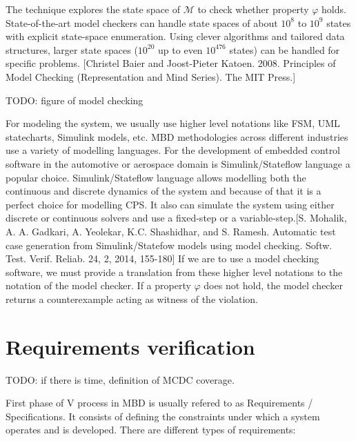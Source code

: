 The technique explores the state space of $\mathcal{M}$ to check whether property $\varphi$ holds. State-of-the-art model checkers can handle state spaces of about $10^8$ to $10^9$ states with explicit state-space enumeration. Using clever algorithms and tailored data structures, larger state spaces ($10^20$ up to even $10^476$ states) can be handled for specific problems. [Christel Baier and Joost-Pieter Katoen. 2008. Principles of Model Checking (Representation and Mind Series). The MIT Press.]

TODO: figure of model checking

For modeling the system, we usually use higher level notations like FSM, UML statecharts, Simulink models, etc. MBD methodologies across different industries use a variety of modelling languages. For the development of embedded control software in the automotive or aerospace domain is Simulink/Stateflow language a popular choice. Simulink/Stateflow language allows modelling both the continuous and discrete dynamics of the system and because of that it is a perfect choice for modelling CPS. It also can simulate the system using either discrete or continuous solvers and use a fixed-step or a variable-step.[S. Mohalik, A. A. Gadkari, A. Yeolekar, K.C. Shashidhar, and S. Ramesh. Automatic test case generation from Simulink/Statefow models using model checking. Softw. Test. Verif. Reliab. 24, 2, 2014, 155-180] If we are to use a model checking software, we must provide a translation from these higher level notations to the notation of the model checker. If a property $\varphi$ does not hold, the model checker returns a counterexample acting as witness of the violation.

\section{Requirements verification}
TODO: if there is time, definition of MCDC coverage.

First phase of V process in MBD is usually refered to as Requirements / Specifications. It consists of defining the constraints under which a system operates and is developed. There are different types of requirements:

